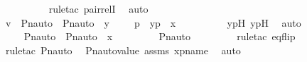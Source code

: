 \begin{isabellebody}
\ \ \ \ \ \ \ \ \isamarkupfalse%
\ {\isacharparenleft}{\kern0pt}rule{\isacharunderscore}{\kern0pt}tac\ pair{\isacharunderscore}{\kern0pt}relI{\isacharparenright}{\kern0pt}\ \isamarkupfalse%
\ auto\ \isanewline
\ \ \ \ \ \ \isamarkupfalse%
\ \isamarkupfalse%
\ {\isachardoublequoteopen}v\ {\isasymin}\ {\isacharbraceleft}{\kern0pt}{\isasymlangle}Pn{\isacharunderscore}{\kern0pt}auto{\isacharparenleft}{\kern0pt}{\isasympi}{\isacharparenright}{\kern0pt}\ {\isacharbackquote}{\kern0pt}\ {\isacharparenleft}{\kern0pt}Pn{\isacharunderscore}{\kern0pt}auto{\isacharparenleft}{\kern0pt}{\isasymtau}{\isacharparenright}{\kern0pt}\ {\isacharbackquote}{\kern0pt}\ y{\isacharparenright}{\kern0pt}{\isacharcomma}{\kern0pt}\ {\isasympi}\ {\isacharbackquote}{\kern0pt}\ {\isacharparenleft}{\kern0pt}{\isasymtau}\ {\isacharbackquote}{\kern0pt}\ p{\isacharparenright}{\kern0pt}{\isasymrangle}\ {\isachardot}{\kern0pt}\ {\isasymlangle}y{\isacharcomma}{\kern0pt}p{\isasymrangle}\ {\isasymin}\ x{\isacharbraceright}{\kern0pt}{\isachardoublequoteclose}\isanewline
\ \ \ \ \ \ \ \ \isamarkupfalse%
\ y{\isacharprime}{\kern0pt}p{\isacharprime}{\kern0pt}H\ ypH\ \isamarkupfalse%
\ auto\ \isanewline
\ \ \ \ \isamarkupfalse%
\isanewline
\ \ \ \ \isamarkupfalse%
\ \isamarkupfalse%
\ {\isachardoublequoteopen}{\isachardot}{\kern0pt}{\isachardot}{\kern0pt}{\isachardot}{\kern0pt}\ {\isacharequal}{\kern0pt}\ Pn{\isacharunderscore}{\kern0pt}auto{\isacharparenleft}{\kern0pt}{\isasympi}{\isacharparenright}{\kern0pt}\ {\isacharbackquote}{\kern0pt}\ {\isacharparenleft}{\kern0pt}Pn{\isacharunderscore}{\kern0pt}auto{\isacharparenleft}{\kern0pt}{\isasymtau}{\isacharparenright}{\kern0pt}\ {\isacharbackquote}{\kern0pt}\ x{\isacharparenright}{\kern0pt}{\isachardoublequoteclose}\ \isanewline
\ \ \ \ \ \ \isamarkupfalse%
\ Pn{\isacharunderscore}{\kern0pt}auto\ \isanewline
\ \ \ \ \ \ \isamarkupfalse%
\ {\isacharparenleft}{\kern0pt}rule{\isacharunderscore}{\kern0pt}tac\ eq{\isacharunderscore}{\kern0pt}flip{\isacharparenright}{\kern0pt}\isanewline
\ \ \ \ \ \ \isamarkupfalse%
\ {\isacharparenleft}{\kern0pt}rule{\isacharunderscore}{\kern0pt}tac\ Pn{\isacharunderscore}{\kern0pt}auto{\isacharparenright}{\kern0pt}\ \isamarkupfalse%
\ Pn{\isacharunderscore}{\kern0pt}auto{\isacharunderscore}{\kern0pt}value\ assms\ xpname\ \isamarkupfalse%
\ auto\ \isanewline
\ \ \ \ \isamarkupfalse%

\end{isabellebody}
